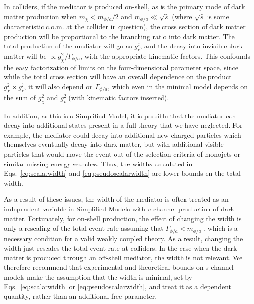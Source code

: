 In colliders, if the mediator is produced on-shell, as is the primary mode of dark matter production when $m_\chi < m_{\phi/a} /2$ and $m_{\phi/a} \ll \sqrt{\hat{s}}$ (where $\sqrt{\hat{s}}$ is some characteristic c.o.m. at the collider in question), the cross section of dark matter production will be proportional to the branching ratio into dark matter. The total production of the mediator will go as $g_v^2$, and the decay into invisible dark matter will be $\propto g_\chi^2/\Gamma_{\phi/a}$, with the appropriate kinematic factors. This confounds the easy factorization of limits on the four-dimensional parameter space, since while the total cross section will have an overall dependence on the product $g_\chi^2 \times g_v^2$, it will also depend on $\Gamma_{\phi/a}$, which even in the minimal model depends on the sum of $g_\chi^2$ and $g_v^2$ (with kinematic factors inserted). 

In addition, as this is a Simplified Model, it is possible that the mediator can decay into additional states present in a full theory that we have neglected. For example, the mediator could decay into additional new charged particles which themselves eventually decay into dark matter, but with additional visible particles that would move the event out of the selection criteria of monojets or similar missing energy searches. Thus, the widths calculated in Eqs.~\eqref{eq:scalarwidth} and \eqref{eq:pseudoscalarwidth} are lower bounds on the total width. 

As a result of these issues, the width of the mediator is often treated as an independent variable in Simplified Models with $s$-channel production of dark matter. Fortunately, for on-shell production, the effect of changing the width is only a rescaling of the total event rate assuming that $\Gamma_{\phi/a} < m_{\phi/a}$ \cite{Buckley:2014fba}, which is a necessary condition for a valid weakly coupled theory. As a result, changing the width just rescales the total event rate at colliders. In the case when the dark matter is produced through an off-shell mediator, the width is not relevant. We therefore recommend that experimental and theoretical bounds on $s$-channel models make the assumption that the width is minimal, set by Eqs.~\eqref{eq:scalarwidth} or \eqref{eq:pseudoscalarwidth}, and treat it as a dependent quantity, rather than an additional free parameter.

